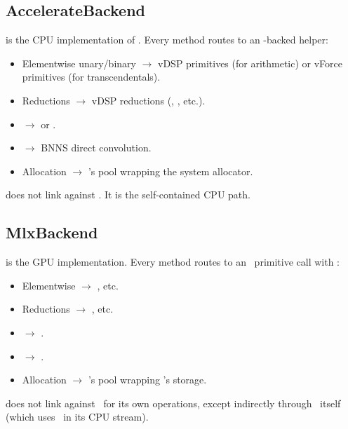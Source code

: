 \subsection{AccelerateBackend}
\label{ssec:backend_dispatch:accelerate}

 is the CPU implementation of
. Every method routes to an \Accelerate-backed
helper:

\begin{itemize}
  \item Elementwise unary/binary $\to$ vDSP primitives (for
    arithmetic) or vForce primitives (for transcendentals).
  \item Reductions $\to$ vDSP reductions (,
    , etc.).
  \item {} $\to$  or
    .
  \item {} $\to$ BNNS direct convolution.
  \item Allocation $\to$ \Lucid's pool wrapping the system
    allocator.
\end{itemize}

 does not link against \MLX. It is the
self-contained CPU path.

\subsection{MlxBackend}
\label{ssec:backend_dispatch:mlx}

 is the GPU implementation. Every method routes
to an \MLX\ primitive call with :

\begin{itemize}
  \item Elementwise $\to$ , etc.
  \item Reductions $\to$ , etc.
  \item {} $\to$ .
  \item {} $\to$ .
  \item Allocation $\to$ \Lucid's pool wrapping
    's storage.
\end{itemize}

 does not link against \Accelerate\ for its own
operations, except indirectly through \MLX\ itself (which uses
\Accelerate\ in its CPU stream).

